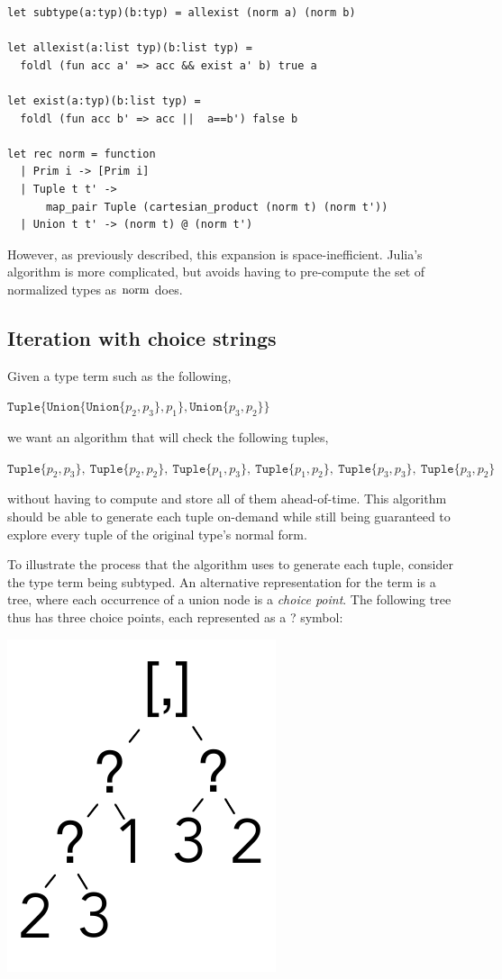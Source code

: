 \documentclass[a4paper,english]{lipics-v2019}
\newcommand{\xt}[1]{\texttt{#1}}
\newcommand{\union}[2]{\xt{Union\{}#1,#2\xt{\}}}
\renewcommand{\c}[1]{\ensuremath{\text{\lstinline{#1}}}\xspace}
\newcommand{\tuple}[1]{\xt{Tuple\{}#1\xt{\}}}
\begin{document}
\begin{lstlisting}
let subtype(a:typ)(b:typ) = allexist (norm a) (norm b)

let allexist(a:list typ)(b:list typ) = 
  foldl (fun acc a' => acc && exist a' b) true a

let exist(a:typ)(b:list typ) = 
  foldl (fun acc b' => acc ||  a==b') false b

let rec norm = function
  | Prim i -> [Prim i]
  | Tuple t t' -> 
      map_pair Tuple (cartesian_product (norm t) (norm t'))
  | Union t t' -> (norm t) @ (norm t')
\end{lstlisting}

However, as previously described, this expansion is space-inefficient. Julia's
algorithm is more complicated, but avoids having to pre-compute the set of normalized
types as \c{norm} does. 


\subsection{Iteration with choice strings}\label{cs}

Given a type term such as the following,

\medskip
$\tuple{ \union{ \union{p_2}{p_3} }{p_1}, \union{p_3}{p_2}}$
\medskip

\noindent
we want an algorithm that will check the following tuples,

\medskip
\noindent $\tuple{p_2,p_3}, ~ \tuple{p_2,p_2}, ~ \tuple{p_1,p_3}, ~ \tuple{p_1,p_2}, ~
  \tuple{p_3,p_3}, ~ \tuple{p_3,p_2}$
\medskip

without having to compute and store all of them ahead-of-time. This algorithm
should be able to generate each tuple on-demand while still being guaranteed to 
explore every tuple of the original type's normal form.

To illustrate the process that the algorithm uses to generate each tuple,
consider the type term being subtyped. An alternative representation for the
term is a tree, where each occurrence of a union node is a \emph{choice point}.
The following tree thus has three choice points, each represented as a ?
symbol: 
\medskip

\includegraphics[scale=.25]{figures/tree1.pdf}
\smallskip
\end{document}
